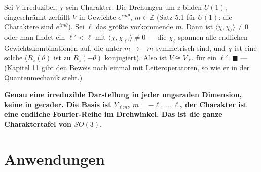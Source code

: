 \begin{merksatz}
Sei $V$ irreduzibel, $\chi$ sein Charakter. Die Drehungen um $z$ bilden $U(1)$; eingeschränkt zerfällt $V$ in Gewichte $e^{im\theta}$, $m\in\mathbb Z$ (Satz 5.1 für $U(1)$: die Charaktere sind $e^{im\theta}$). Sei $\ell$ das größte vorkommende $m$. Dann ist $\langle\chi, \chi_\ell\rangle\neq0$ oder man findet ein $\ell' < \ell$ mit $\langle\chi, \chi_{\ell'}\rangle\neq0$ --- die $\chi_\ell$ spannen alle endlichen Gewichtskombinationen auf, die unter $m\to-m$ symmetrisch sind, und $\chi$ ist eine solche ($R_z(\theta)$ ist zu $R_z(-\theta)$ konjugiert). Also ist $V\cong V_{\ell'}$ für ein $\ell'$. $\blacksquare$ --- (Kapitel 11 gibt den Beweis noch einmal mit Leiteroperatoren, so wie er in der Quantenmechanik steht.)

\begin{center}
\begin{minipage}{0.9\textwidth}
\textbf{Genau eine irreduzible Darstellung in jeder ungeraden Dimension, keine in gerader. Die Basis ist $Y_{\ell m}$, $m = -\ell, \dots, \ell$, der Charakter ist eine endliche Fourier-Reihe im Drehwinkel. Das ist die ganze Charaktertafel von $SO(3)$.}
\end{minipage}
\end{center}
\end{merksatz}

\section{Anwendungen}

